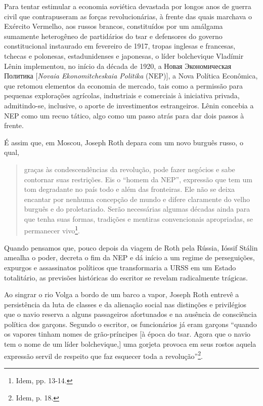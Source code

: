 Para tentar estimular a economia soviética devastada por longos anos de
guerra civil que contrapuseram as forças revolucionárias, à frente das
quais marchava o Exército Vermelho, aos russos brancos, constituídos por
um amálgama sumamente heterogêneo de partidários do tsar e defensores do
governo constitucional instaurado em fevereiro de 1917, tropas inglesas
e francesas, tchecas e polonesas, estadunidenses e japonesas, o líder
bolchevique Vladímir Lênin implementou, no início da década de 1920, a
Новая Экономическая Политика {[}\emph{Novaia Ekonomitcheskaia Politika}
(NEP){]}, a Nova Política Econômica, que retomou elementos da economia
de mercado, tais como a permissão para pequenas explorações agrícolas,
industriais e comerciais à iniciativa privada, admitindo-se, inclusive,
o aporte de investimentos estrangeiros. Lênin concebia a NEP como um
recuo tático, algo como um passo atrás para dar dois passos à frente.

É assim que, em Moscou, Joseph Roth depara com um novo burguês russo, o
qual,

\begin{quote}
graças às condescendências da revolução, pode fazer negócios e sabe
contornar suas restrições. Eis o ``homem da NEP'', expressão que tem um
tom degradante no país todo e além das fronteiras. Ele não se deixa
encantar por nenhuma concepção de mundo e difere claramente do velho
burguês e do proletariado. Serão necessárias algumas décadas ainda para
que tenha suas formas, tradições e mentiras convencionais apropriadas,
se permanecer vivo\footnote{Idem, pp. 13-14.}.
\end{quote}

Quando pensamos que, pouco depois da viagem de Roth pela Rússia, Ióssif
Stálin amealha o poder, decreta o fim da NEP e dá início a um regime de
perseguições, expurgos e assassinatos políticos que transformaria a URSS
em um Estado totalitário, as previsões históricas do escritor se revelam
radicalmente trágicas.

Ao singrar o rio Volga a bordo de um barco a vapor, Joseph Roth entrevê
a persistência da luta de classes e da alienação social nas distinções e
privilégios que o navio reserva a alguns passageiros afortunados e na
ausência de consciência política dos garçons. Segundo o escritor, os
funcionários já eram garçons ``quando os vapores tinham nomes de
grão-príncipes {[}à época do tsar. Agora que o navio tem o nome de um
líder bolchevique,{]} uma gorjeta provoca em seus rostos aquela
expressão servil de respeito que faz esquecer toda a
revolução''\footnote{Idem, p. 18.}.

